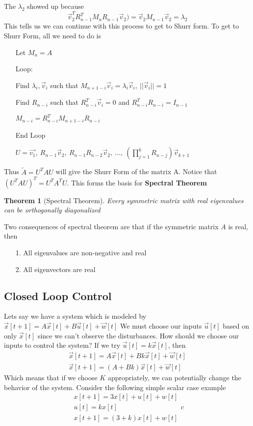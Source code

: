 \documentclass{article}
\newtheorem{theorem}{Theorem}
\begin{document}
The $\lambda_2$ showed up because
$$\vec{v}_2^TR_{n-1}^TM_nR_{n-1}\vec{v}_2)=\vec{v}_2M_{n-1}\vec{v}_2=\lambda_2$$
This tells us we can continue with this process to get to Shurr form.
To get to Shurr Form, all we need to do is
\begin{itemize}
    \item[] Let $M_n=A$
    \item[Loop:]
    \item[] Find $\lambda_i, \vec{v}_i$ such that $M_{n+1-i}\vec{v}_i=\lambda_i\vec{v}_i,\ ||\vec{v}_i||=1$
    \item[] Find $R_{n-i}$ such that $R_{n-i}^T\vec{v}_i=0$ and $R_{n-i}^TR_{n-i}=I_{n-1}$
    \item[] $M_{n-i} = R_{n-i}^TM_{n+1-i}R_{n-i}$
    \item[End Loop]
    \item[] $U = \vec{v_1},\ R_{n-1}\vec{v}_2,\ R_{n-1}R_{n-2}\vec{v}_2,\ ...,\ (\prod_{j=1}^{k}{R_{n-j}})\vec{v}_{k+1}$
\end{itemize}
Thus $\tilde{A}=U^TAU$ will give the Shurr Form of the matrix A.
Notice that $(U^TAU)^T=U^TA^TU$. This forms the basis for \textbf{Spectral Theorem}
\begin{theorem}[Spectral Theorem]
    Every symmetric matrix with real eigenvalues can be orthogonally diagonalized
\end{theorem}
Two consequences of spectral theorem are that if the symmetric matrix $A$ is real, then
\begin{itemize}
    \item[1. ] All eigenvalues are non-negative and real
    \item[2. ] All eigenvectors are real
\end{itemize}

\subsection{Closed Loop Control}
Lets say we have a system which is modeled by $\vec{x}[t+1]=A \vec{x}[t]+B\vec{u}[t]+\vec{w}[t]$
We must choose our inputs $\vec{u}[t]$ based on only $\vec{x}[t]$ since we can't observe the disturbances. How should we choose our inputs to control the system?
If we try $\vec{u}[t]=k\vec{x}[t]$, then
\[
    \begin{array}{c}
        \vec{x}[t+1]=A\vec{x}[t]+Bk\vec{x}[t]+\vec{w}[t]\\
        \vec{x}[t+1]=(A+Bk)\vec{x}[t]+\vec{w}[t]
    \end{array}
\]
Which means that if we choose $K$ appropriately, we can potentially change the behavior of the system.
Consider the following simple scalar case example
\[
    \begin{array}{c}
        x[t+1]=3x[t]+u[t]+w[t]\\
        u[t] = kx[t]\\
        x[t+1] = (3+k)x[t]+w[t]
    \end{array}{c}
\]
\end{document}
